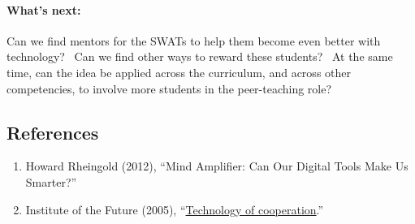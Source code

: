 \paragraph{What's next:}\label{whats-next}

Can we find mentors for the SWATs to help them become even better with
technology? ~Can we find other ways to reward these students? ~At the
same time, can the idea be applied across the curriculum, and across
other competencies, to involve more students in the peer-teaching role?

\subsection{References}\label{references}

\begin{enumerate}
\def\labelenumi{\arabic{enumi}.}
\item
  Howard Rheingold (2012), ``Mind Amplifier: Can Our Digital Tools Make
  Us Smarter?''
\item
  Institute of the Future (2005),
  ``\href{http://www.rheingold.com/cooperation/Technology_of_cooperation.pdf}{Technology
  of cooperation}.''
\end{enumerate}
